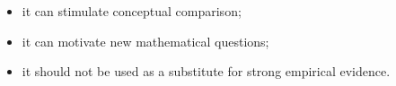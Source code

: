 \begin{itemize}[nosep]
  \item it can stimulate conceptual comparison;
  \item it can motivate new mathematical questions;
  \item it should not be used as a substitute for strong empirical evidence.
\end{itemize}
